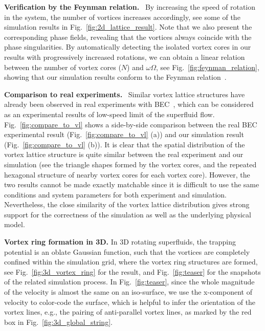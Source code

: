 \documentclass[10pt,journal,compsoc,twoside]{IEEEtran}
\newcommand{\rd}[1]{{\color[rgb]{0.0,0.0,0.0}{#1}}}
\begin{document}
	\vspace{0.15cm}
	\noindent
	\textbf{Verification by the Feynman relation.} \
	By increasing the speed of rotation in the system, the number of vortices increases accordingly, see some of the simulation results in Fig.~\ref{fig:2d_lattice_result}.
	Note that we also present the corresponding phase fields, revealing that the vortices always coincide with the phase singularities.
	By automatically detecting the isolated vortex cores in our results with progressively increased rotations, we can obtain a linear relation between the number of vortex cores ($N$) and $\omega \Omega$, see Fig.~\ref{fig:feynman_relation}, showing that our simulation results \rd{approximately} conform to the Feynman relation~\cite{Feynman-55}.
	
	\vspace{0.15cm}
	\noindent
	\textbf{Comparison to real experiments.} \
	Similar vortex lattice structures have already been observed in real experiments with BEC~\cite{Abo-Shaeer_01}, which can be considered as an experimental results of low-speed limit of the superfluid flow.
	Fig.~\ref{fig:compare_to_vl} shows a side-by-side comparison between the real BEC experimental result (Fig.~\ref{fig:compare_to_vl} (a)) and our simulation result (Fig.~\ref{fig:compare_to_vl} (b)).
	It is clear that the spatial distribution of the vortex lattice structure is quite similar between the real experiment and our simulation (see the triangle shapes formed by the vortex cores, and the repeated hexagonal structure of nearby vortex cores for each vortex core).
	However, the two results cannot be made exactly matchable since it is difficult to use the same conditions and system parameters for both experiment and simulation.
	Nevertheless, the close similarity of the vortex lattice distribution gives strong support for the correctness of the simulation as well as the underlying physical model.
	
	\vspace{0.15cm}
	\noindent
	\textbf{Vortex ring formation in 3D.}
	In 3D rotating superfluids, the trapping potential is an oblate Gaussian function, such that the vortices are completely confined within the simulation grid, where the vortex ring structures are formed, see Fig.~\ref{fig:3d_vortex_ring} for the result, and Fig.~\ref{fig:teaser} for the snapshots of the related simulation process.
	In Fig.~\ref{fig:teaser}, since the whole magnitude of the velocity is almost the same on an iso-surface, we use the x-component of velocity to color-code the surface, which is helpful to infer the orientation of the vortex lines, e.g., the pairing of anti-parallel vortex lines, as marked by the red box in Fig.~\ref{fig:3d_global_string}.
	
\end{document}
